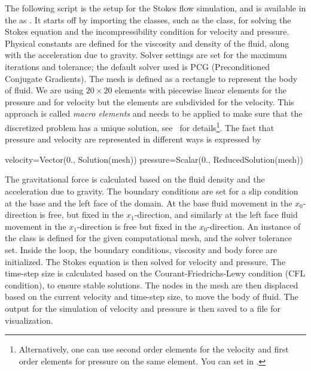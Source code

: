 The following \PYTHON script is the setup for the Stokes flow simulation, and
is available in the \ExampleDirectory as .
It starts off by importing the classes, such as the 
class, for solving the Stokes equation and the incompressibility condition for
velocity and pressure.
Physical constants are defined for the viscosity and density of the fluid,
along with the acceleration due to gravity.
Solver settings are set for the maximum iterations and tolerance; the default
solver used is PCG (Preconditioned Conjugate Gradients).
The mesh is defined as a rectangle to represent the body of fluid.
We are using $20 \times 20$ elements with piecewise linear elements for the
pressure and for velocity but the elements are subdivided for the velocity.
This approach is called \textit{macro elements} and
needs to be applied to make sure that the discretized problem has a unique
solution, see~\cite{LBB} for details\footnote{Alternatively, one can use
second order elements for the velocity and first order elements for pressure
on the same element. You can set  in .}.
The fact that pressure and velocity are represented in different ways is
expressed by
\begin{python}
  velocity=Vector(0., Solution(mesh))
  pressure=Scalar(0., ReducedSolution(mesh))
\end{python}
The gravitational force is calculated based on the fluid density and the
acceleration due to gravity.
The boundary conditions are set for a slip condition at the base and the left
face of the domain. At the base fluid movement in the $x_{0}$-direction
is free, but fixed in the $x_{1}$-direction, and similarly at the left
face fluid movement in the $x_{1}$-direction is free  but fixed in
the $x_{0}$-direction.
An instance of the  class is defined for the
given computational mesh, and the solver tolerance set.
Inside the  loop, the boundary conditions, viscosity and body
force are initialized.
The Stokes equation is then solved for velocity and pressure.
The time-step size is calculated based on the Courant-Friedrichs-Lewy condition
(CFL condition), to ensure stable solutions.
The nodes in the mesh are then displaced based on the current velocity and
time-step size, to move the body of fluid.
The output for the simulation of velocity and pressure is then saved to a file
for visualization.
%
